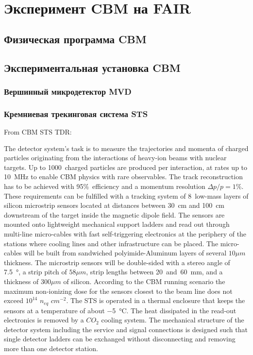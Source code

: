 \chapter{Эксперимент CBM на FAIR}\label{sec:secCbm}

\section{Физическая программа CBM}

\section{Экспериментальная установка CBM}\label{sec:secCbmSetup}

\subsection{Вершинный микродетектор MVD}\label{sec:secMVD}

\subsection{Кремниевая трекинговая система STS}\label{sec:secSTS}

From CBM STS TDR:

The detector system’s task is to measure the trajectories and momenta of charged particles originating from the interactions of heavy-ion beams with nuclear targets. Up to 1000~charged particles are produced per interaction, at rates up to 10~MHz to enable CBM physics with rare observables. The track reconstruction has to be achieved with 95\%~efficiency and a momentum resolution $\Delta p / p = 1\%$. These requirements can be fulfilled with a tracking system of 8~low-mass layers of silicon microstrip sensors located at distances between 30~cm and 100~cm downstream of the target inside the magnetic dipole field.
The sensors are mounted onto lightweight mechanical support ladders and read out through multi-line micro-cables with fast self-triggering electronics at the periphery of the stations where cooling lines and other infrastructure can be placed. The micro-cables will be built from sandwiched polyimide-Aluminum layers of several $10 \mu m$ thickness. The microstrip sensors will be double-sided with a stereo angle of \SI{7.5}{\degree}, a strip pitch of $58 \mu m$, strip lengths between 20~and~60~mm, and a thickness of $300 \mu m$ of silicon. According to the CBM running scenario the maximum non-ionizing dose for the sensors closest to the beam line does not exceed $10^{14}$ $n_{eq}$ $cm^{-2}$. The STS is operated in a thermal enclosure that keeps the sensors at a temperature of about \SI{-5}{\degreeCelsius}. The heat dissipated in the read-out electronics is removed by a $CO_{2}$ cooling system. The mechanical structure of the detector system including the service and signal connections is designed such that single detector ladders can be exchanged without disconnecting and removing more than one detector station.

